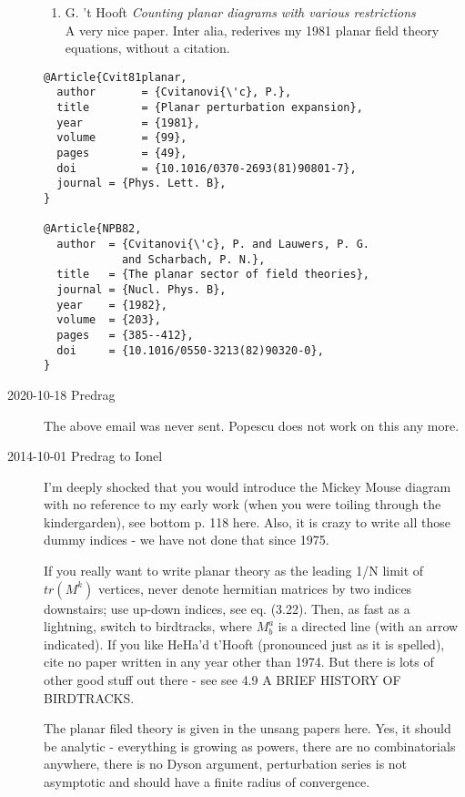 \begin{description}
\begin{enumerate}
  \item
 G. 't Hooft
 {\emph{Counting planar diagrams with various restrictions}}\\
A very nice paper. Inter alia, rederives my 1981 planar field theory
 equations, without a citation.
\end{enumerate}

\begin{verbatim}
@Article{Cvit81planar,
  author       = {Cvitanovi{\'c}, P.},
  title        = {Planar perturbation expansion},
  year         = {1981},
  volume       = {99},
  pages        = {49},
  doi          = {10.1016/0370-2693(81)90801-7},
  journal = {Phys. Lett. B},
}

@Article{NPB82,
  author  = {Cvitanovi{\'c}, P. and Lauwers, P. G.
            and Scharbach, P. N.},
  title   = {The planar sector of field theories},
  journal = {Nucl. Phys. B},
  year    = {1982},
  volume  = {203},
  pages   = {385--412},
  doi     = {10.1016/0550-3213(82)90320-0},
}
\end{verbatim}

\item[2020-10-18 Predrag]
The above email was never sent. Popescu does not work on this any more.

\item[2014-10-01 Predrag to Ionel]
I'm deeply shocked that you would introduce the Mickey Mouse diagram with
no reference to my early work (when you were toiling through the
kindergarden), see bottom p. 118
{here}. Also, it is crazy to write all
those dummy indices - we have not done that  since 1975.

If you really want to write planar theory as the leading 1/N limit of
$tr(M^k)$ vertices, never denote hermitian matrices by two indices
downstairs; use up-down indices, see eq. (3.22). Then, as fast as a
lightning, switch to birdtracks, where $M^a_b$ is a directed line (with
an arrow indicated). If you like HeHa'd t'Hooft (pronounced just as it is
spelled), cite no paper written in any year other than 1974. But there is
lots of other good stuff out there - see see 4.9 A BRIEF HISTORY OF
BIRDTRACKS.

The planar filed theory is given in the unsang papers here. Yes, it
should be analytic - everything is growing as powers, there are no
combinatorials anywhere, there is no Dyson argument, perturbation series
is not asymptotic and should have a finite radius of convergence.


\end{description}
